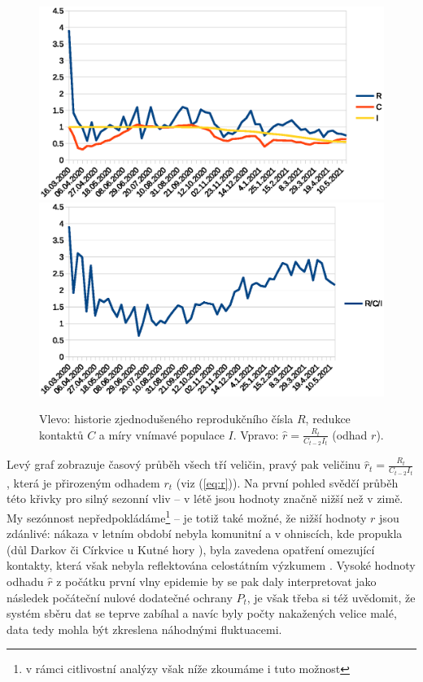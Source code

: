 \begin{figure}
\begin{center}
\includegraphics[scale=0.4]{pic/rc}\includegraphics[scale=0.4]{pic/rci}
\caption{Vlevo: historie zjednodušeného reprodukčního čísla $R$, redukce kontaktů $C$ a míry vnímavé populace $I$. Vpravo: $\hat{r} = \frac{R_{t}}{C_{t-2}I_t}$ (odhad $r$).} 
\label{fig:rci}
\end{center}
\end{figure}
Levý graf zobrazuje časový průběh všech tří veličin, pravý pak veličinu
$\hat{r}_t = \frac{R_{t}}{C_{t-2}I_{t}}$, která je přirozeným odhadem $r_{t}$
(viz (\ref{eq:r})). Na první pohled svědčí průběh této 
křivky pro silný sezonní vliv -- v létě jsou hodnoty značně
nižší než v zimě. My sezónnost nepředpokládáme\footnote{v rámci citlivostní analýzy však níže zkoumáme i tuto možnost} -- je totiž také možné, že nižší hodnoty
$r$ jsou zdánlivé: nákaza v letním období nebyla komunitní a v ohniscích,
kde propukla (důl Darkov \cite{darkov} či Církvice u Kutné hory \cite{cirkvice}),
byla zavedena opatření omezující kontakty, která však nebyla reflektována
celostátním výzkumem \cite{paqcovid}.
 Vysoké hodnoty odhadu $\hat r$ z počátku první vlny
epidemie by se pak daly interpretovat jako následek počáteční nulové dodatečné
ochrany $P_{t}$, je však třeba si též uvědomit, že systém sběru
dat se teprve zabíhal a navíc byly počty nakažených velice malé, data
tedy mohla být zkreslena náhodnými fluktuacemi. 

